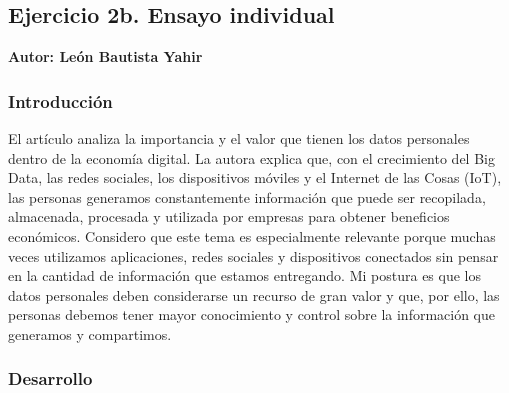 %

\newpage
\subsection*{Ejercicio 2b. Ensayo individual}

\begin{flushright}
\textbf{Autor: León Bautista Yahir}
\end{flushright}

\subsubsection*{Introducción}

El artículo analiza la importancia y el valor que tienen los datos personales 
dentro de la economía digital. La autora explica que, con el crecimiento del Big Data, las redes sociales, 
los dispositivos móviles y el Internet de las Cosas (IoT), las personas generamos constantemente información 
que puede ser recopilada, almacenada, procesada y utilizada por empresas para obtener beneficios económicos.
Considero que este tema es especialmente relevante porque muchas veces utilizamos aplicaciones, redes sociales 
y dispositivos conectados sin pensar en la cantidad de información que estamos entregando. Mi postura es que los 
datos personales deben considerarse un recurso de gran valor y que, por ello, las personas debemos tener mayor 
conocimiento y control sobre la información que generamos y compartimos.

\subsubsection*{Desarrollo}

